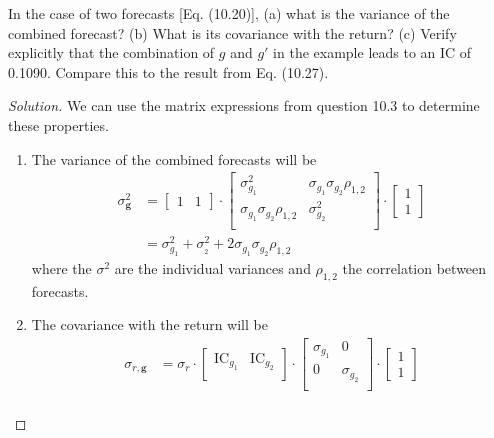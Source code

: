 \begin{problem}{10.4}
  In the case of two forecasts [Eq. (10.20)], (a) what is the variance of the combined forecast? (b) What is its covariance with the return? (c) Verify explicitly that the combination of $g$ and $g'$ in the example leads to an IC of 0.1090. Compare this to the result from Eq. (10.27).
\end{problem}

\begin{proof}[Solution]
  We can use the matrix expressions from question 10.3 to determine these properties.\\
  \begin{enumerate}[label=(\alph*)]
    \item{The variance of the combined forecasts will be
      \begin{align*}
       \sigma^{2}_{\bm{g}}&=\begin{bmatrix} 1 & 1 \end{bmatrix}\cdot \begin{bmatrix} \sigma_{g_{1}}^{2} & \sigma_{g_{1}}\sigma_{g_{2}}\rho_{1,2} \\ \sigma_{g_{1}}\sigma_{g_{2}}\rho_{1,2}	& \sigma_{g_{2}}^{2}\\ \end{bmatrix}\cdot \begin{bmatrix} 1 \\ 1 \end{bmatrix}\\
       &=\sigma_{g_1}^{2}+\sigma_{_2}^{2}+2\sigma_{g_1}\sigma_{g_2}\rho_{1,2}
      \end{align*}
      where the $\sigma^2$ are the individual variances and $\rho_{1,2}$ the correlation between forecasts.}
    \item{The covariance with the return will be
    \begin{align*}
    \sigma_{r,\bm{g}}&=\sigma_{r}\cdot \begin{bmatrix} \mathrm{IC}_{g_{1}} & \mathrm{IC}_{g_{2}} \\\end{bmatrix}
				\cdot\begin{bmatrix} \sigma_{g_{1}}&0\\  0&\sigma_{g_{2}} \\ \end{bmatrix}\cdot \begin{bmatrix} 1 \\ 1 \end{bmatrix}\\

\end{align*}}
\end{enumerate}
\end{proof}
